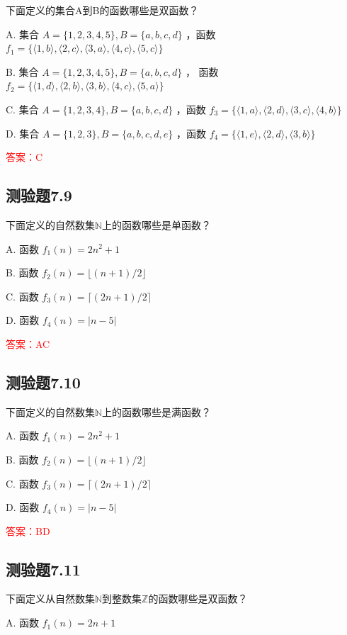 \documentclass[UTF8, heading=true]{ctexart}
\begin{document}
下面定义的集合A到B的函数哪些是双函数？

A. 集合 $A=\{1,2,3,4,5\}, B=\{a, b, c, d\}$ ，函数 $f_1=\{\langle 1, b\rangle,\langle 2, c\rangle,\langle 3, a\rangle,\langle 4, c\rangle,\langle 5, c\rangle\}$ 

B. 集合 $A=\{1,2,3,4,5\}, B=\{a, b, c, d\}$ ，
函数 $f_2=\{\langle 1, d\rangle,\langle 2, b\rangle,\langle 3, b\rangle,\langle 4, c\rangle,\langle 5, a\rangle\}$ 

C. 集合 $A=\{1,2,3,4\}, B=\{a, b, c, d\}$ ，函数 $f_3=\{\langle 1, a\rangle,\langle 2, d\rangle,\langle 3, c\rangle,\langle 4, b\rangle\}$ 

D. 集合 $A=\{1,2,3\}, B=\{a, b, c, d, e\}$ ，函数 $f_4=\{\langle 1, e\rangle,\langle 2, d\rangle,\langle 3, b\rangle\}$


\textcolor{red}{答案：C}

\subsection{测验题7.9}

下面定义的自然数集$\mathbb{N}$上的函数哪些是单函数？

A. 函数 $f_1(n)=2 n^2+1$

B. 函数 $f_2(n)=\lfloor(n+1) / 2\rfloor$

C. 函数 $f_3(n)=\lceil(2 n+1) / 2\rceil$

D. 函数 $f_4(n)=|n-5|$

\textcolor{red}{答案：AC}

\subsection{测验题7.10}

下面定义的自然数集$\mathbb{N}$上的函数哪些是满函数？

A. 函数 $f_1(n)=2 n^2+1$

B. 函数 $f_2(n)=\lfloor(n+1) / 2\rfloor$

C. 函数 $f_3(n)=\lceil(2 n+1) / 2\rceil$

D. 函数 $f_4(n)=|n-5|$

\textcolor{red}{答案：BD}

\subsection{测验题7.11}

下面定义从自然数集$\mathbb{N}$到整数集$\mathbb{Z}$的函数哪些是双函数？

A. 函数 $f_1(n)=2 n+1$
\end{document}
